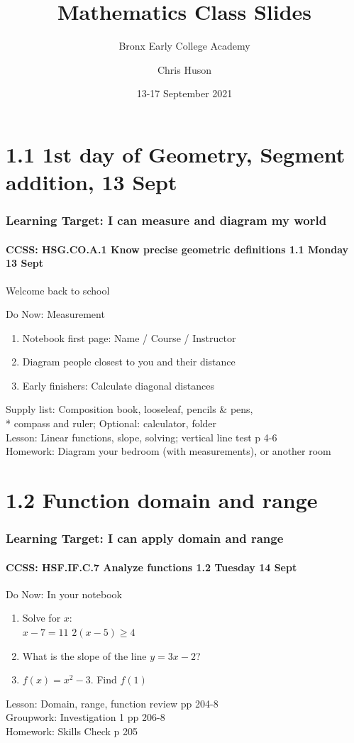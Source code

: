 \documentclass{beamer}
\title{Mathematics Class Slides}
\subtitle{Bronx Early College Academy}
\author{Chris Huson}
\date{13-17 September 2021}
\begin{document}
\frame{\titlepage}
\section[Outline]{}
\frame{\tableofcontents}


\section{1.1 1st day of Geometry, Segment addition, 13 Sept}
\frame
{
  \frametitle{Learning Target: I can measure and diagram my world}
  \framesubtitle{CCSS: HSG.CO.A.1 Know precise geometric definitions \hfill \alert{1.1 Monday 13 Sept}}

  Welcome back to school
  \begin{block}{Do Now: Measurement}
  \begin{enumerate}
      \item Notebook first page: Name / Course / Instructor
      \item Diagram people closest to you and their distance
      \item Early finishers: Calculate diagonal distances
  \end{enumerate}
  \end{block}
  Supply list: Composition book, looseleaf, pencils \& pens, \\*
  compass and ruler; Optional: calculator, folder \\[0.25cm]
  Lesson: Linear functions, slope, solving; vertical line test p 4-6 \\[0.25cm]
  Homework: Diagram your bedroom (with measurements), or another room
}


  \section{1.2 Function domain and range}
  \frame
  {
    \frametitle{Learning Target: I can apply domain and range}
    \framesubtitle{CCSS: HSF.IF.C.7 Analyze functions \hfill \alert{1.2 Tuesday 14 Sept}}

    \begin{block}{Do Now: In your notebook}
    \begin{enumerate}
      \item Solve for $x$: \\
      \hspace{1cm} $x-7=11$ \hspace{1cm}  $2(x-5) \geq 4$
      \item What is the slope of the line $y=3x-2$?
      \item $f(x) = x^2 - 3$. Find $f(1)$
    \end{enumerate}
    \end{block}
    Lesson: Domain, range, function review pp 204-8\\[5pt]
    Groupwork: Investigation 1 pp 206-8\\[5pt]
    Homework: Skills Check p 205
  }
\end{document}
